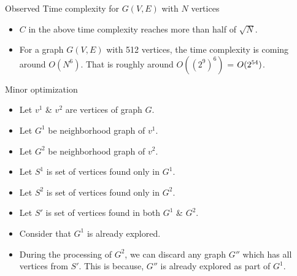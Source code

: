 \documentclass[landscape]{slides}
\begin{document}
\begin{slide}
	\begin{center}
		Observed Time complexity for $G(V, E)$ with $N$ vertices
	\end{center}
	\begin{itemize}
		\setlength{\itemsep}{0pt}
		\setlength{\parskip}{10pt}
		\setlength{\parsep}{0pt}
		\item $C$ in the above time complexity reaches more than half of $\sqrt{N}$.
		\item For a graph $G(V,E)$ with 512 vertices, the time complexity is coming around $O(N^6)$. That is roughly around $O((2^9)^6)$ = $O(2\textsuperscript{54})$.
	\end{itemize}
\end{slide}


\begin{slide}
	\begin{center}
		Minor optimization
	\end{center}
	\begin{itemize}
		\setlength{\itemsep}{0pt}
		\setlength{\parskip}{10pt}
		\setlength{\parsep}{0pt}
		\item Let $v^1$ \& $v^2$ are vertices of graph $G$.
		\item Let $G^1$ be neighborhood graph of $v^1$.
		\item Let $G^2$ be neighborhood graph of $v^2$.
		\item Let $S^1$ is set of vertices found only in $G^1$.
		\item Let $S^2$ is set of vertices found only in $G^2$.
		\item Let $S'$ is set of vertices found in both $G^1$ \& $G^2$.
		\item Consider that $G^1$ is already explored.
		\item During the processing of $G^2$, we can discard any graph $G''$ which has all vertices from $S'$. This is because, $G''$ is already explored as part of $G^1$.
	\end{itemize}
\end{slide}
\end{document}
